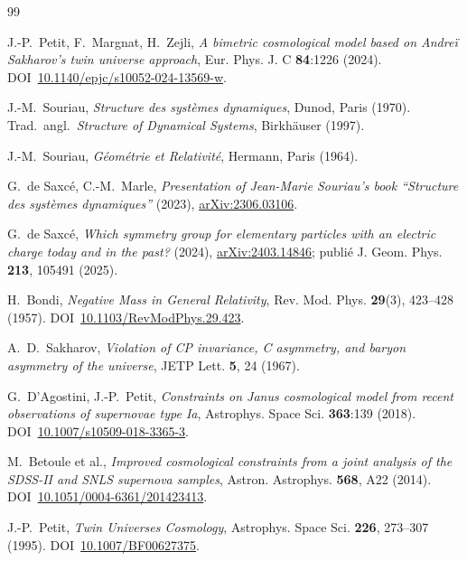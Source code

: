 \documentclass[11pt,a4paper]{article}
\theoremstyle{definition}
\theoremstyle{plain}
\begin{document}
\begin{thebibliography}{99}

 J.-P.~Petit, F.~Margnat, H.~Zejli,
\emph{A bimetric cosmological model based on Andreï Sakharov's twin universe approach},
Eur. Phys. J. C \textbf{84}:1226 (2024).
DOI~\href{https://doi.org/10.1140/epjc/s10052-024-13569-w}{10.1140/epjc/s10052-024-13569-w}.

 J.-M.~Souriau,
\emph{Structure des systèmes dynamiques}, Dunod, Paris (1970).
Trad.~angl.~\emph{Structure of Dynamical Systems}, Birkhäuser (1997).

 J.-M.~Souriau,
\emph{Géométrie et Relativité}, Hermann, Paris (1964).

 G.~de Saxcé, C.-M.~Marle,
\emph{Presentation of Jean-Marie Souriau's book ``Structure des systèmes dynamiques''} (2023),
\href{https://arxiv.org/abs/2306.03106}{arXiv:2306.03106}.

 G.~de Saxcé,
\emph{Which symmetry group for elementary particles with an electric charge today and in the past?} (2024),
\href{https://arxiv.org/abs/2403.14846}{arXiv:2403.14846}; publié J. Geom. Phys. \textbf{213}, 105491 (2025).

 H.~Bondi,
\emph{Negative Mass in General Relativity}, Rev. Mod. Phys. \textbf{29}(3), 423--428 (1957).
DOI~\href{https://doi.org/10.1103/RevModPhys.29.423}{10.1103/RevModPhys.29.423}.

 A.~D.~Sakharov,
\emph{Violation of CP invariance, C asymmetry, and baryon asymmetry of the universe},
JETP Lett. \textbf{5}, 24 (1967).

 G.~D'Agostini, J.-P.~Petit,
\emph{Constraints on Janus cosmological model from recent observations of supernovae type Ia},
Astrophys. Space Sci. \textbf{363}:139 (2018).
DOI~\href{https://doi.org/10.1007/s10509-018-3365-3}{10.1007/s10509-018-3365-3}.

 M.~Betoule et al.,
\emph{Improved cosmological constraints from a joint analysis of the SDSS-II and SNLS supernova samples},
Astron. Astrophys. \textbf{568}, A22 (2014).
DOI~\href{https://doi.org/10.1051/0004-6361/201423413}{10.1051/0004-6361/201423413}.

 J.-P.~Petit,
\emph{Twin Universes Cosmology}, Astrophys. Space Sci. \textbf{226}, 273--307 (1995).
DOI~\href{https://doi.org/10.1007/BF00627375}{10.1007/BF00627375}.


\end{thebibliography}
\end{document}
